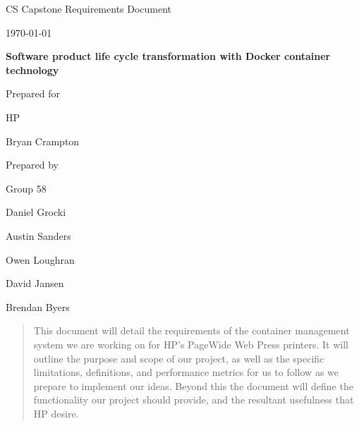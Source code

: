 \documentclass[onecolumn, draftclsnofoot,10pt, compsoc]{IEEEtran}
\def \CapstoneTeamName{		The Cleverly Named Team}
\def \CapstoneTeamNumber{		58}
\def \GroupMemberOne{			Daniel Grocki}
\def \GroupMemberTwo{			Austin Sanders}
\def \GroupMemberThree{			Owen Loughran}
\def \GroupMemberFour{			David Jansen}
\def \GroupMemberFive{			Brendan Byers}
\def \CapstoneProjectName{		Software product life cycle transformation with Docker container technology}
\def \CapstoneSponsorCompany{	HP}
\def \CapstoneSponsorPerson{		Bryan Crampton}
\def \DocType{		%
				Requirements Document
				}
\newcommand{\NameSigPair}[1]{\par
\makebox[2.75in][r]{#1} \hfil 	\makebox[3.25in]{\makebox[2.25in]{\hrulefill} \hfill		\makebox[.75in]{\hrulefill}}
\par\vspace{-12pt} \textit{\tiny\noindent
\makebox[2.75in]{} \hfil		\makebox[3.25in]{\makebox[2.25in][r]{Signature} \hfill	\makebox[.75in][r]{Date}}}}
\renewcommand{\NameSigPair}[1]{#1}
\begin{document}
\begin{titlepage}
    \begin{singlespace}
        \hfill 
        \par\vspace{.2in}
        \centering
        \scshape{
            \huge CS Capstone \DocType \par
            {\large\today}\par
            \vspace{.5in}
            \textbf{\Huge\CapstoneProjectName}\par
            \vfill
            {\large Prepared for}\par
            \Huge \CapstoneSponsorCompany\par
            \vspace{5pt}
            {\Large\NameSigPair{\CapstoneSponsorPerson}\par}
            {\large Prepared by }\par
            Group\CapstoneTeamNumber\par
            \vspace{5pt}
            {\Large
                \NameSigPair{\GroupMemberOne}\par
                \NameSigPair{\GroupMemberTwo}\par
                \NameSigPair{\GroupMemberThree}\par
                \NameSigPair{\GroupMemberFour}\par
                \NameSigPair{\GroupMemberFive}\par
            }
            \vspace{20pt}
        }
        \begin{abstract}
            	This document will detail the requirements of the container management system we are working on for HP’s PageWide Web Press printers. It will outline the purpose and scope of our project, as well as the specific limitations, definitions, and performance metrics for us to follow as we prepare to implement our ideas. Beyond this the document will define the functionality our project should provide, and the resultant usefulness that HP desire.

        \end{abstract}     
    \end{singlespace}
\end{titlepage}
\newpage
{}
\clearpage
\end{document}

